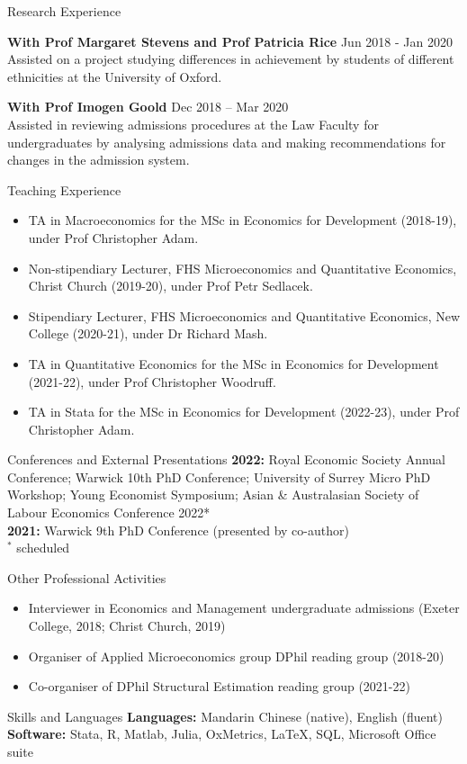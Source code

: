 \documentclass{resume} %
\begin{document}
\begin{rSection}{Research Experience}

{\bf With Prof Margaret Stevens and Prof Patricia Rice} \hfill Jun 2018 - Jan 2020 \\
Assisted on a project studying differences in achievement by students of different ethnicities at the University of Oxford.

{\bf With Prof Imogen Goold} \hfill Dec 2018 – Mar 2020 \\
Assisted in reviewing admissions procedures at the Law Faculty for undergraduates by analysing admissions data and making recommendations for changes in the admission system.

\end{rSection}

\begin{rSection}{Teaching Experience}
 
\begin{itemize}
    \itemsep0em
    \item TA in Macroeconomics for the MSc in Economics for Development (2018-19), under Prof Christopher Adam. 
    \item Non-stipendiary Lecturer, FHS Microeconomics and Quantitative Economics, Christ Church (2019-20), under Prof Petr Sedlacek.
    \item Stipendiary Lecturer, FHS Microeconomics and Quantitative Economics, New College (2020-21), under Dr Richard Mash.
    \item TA in Quantitative Economics for the MSc in Economics for Development (2021-22), under Prof Christopher Woodruff. 
    \item TA in Stata for the MSc in Economics for Development (2022-23), under Prof Christopher Adam.
\end{itemize} 

\end{rSection}

\begin{rSection}{Conferences and External Presentations}
 \textbf{2022:} Royal Economic Society Annual Conference; Warwick 10th PhD Conference; University of Surrey Micro PhD Workshop; Young Economist Symposium; Asian \& Australasian Society of Labour Economics Conference 2022* \\
 \textbf{2021:} Warwick 9th PhD Conference (presented by co-author) \\
$^*$ scheduled
\end{rSection}

\begin{rSection}{Other Professional Activities}
\begin{itemize}
    \item Interviewer in Economics and Management undergraduate admissions (Exeter College, 2018; Christ Church, 2019)
    \item Organiser of Applied Microeconomics group DPhil reading group (2018-20)
    \item Co-organiser of DPhil Structural Estimation reading group (2021-22)
\end{itemize}
\end{rSection}

\begin{rSection}{Skills and Languages}
 \textbf{Languages:} Mandarin Chinese (native), English (fluent) \\
 \textbf{Software:} Stata, R, Matlab, Julia, OxMetrics, LaTeX, SQL, Microsoft Office suite
\end{rSection}
\end{document}
